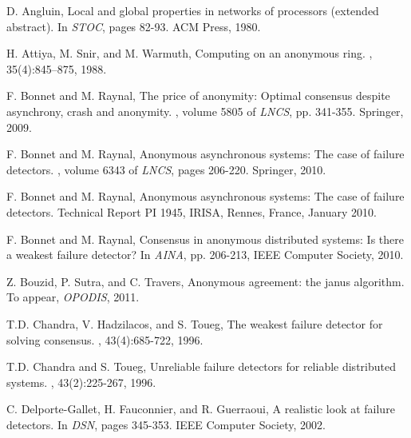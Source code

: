 \documentclass[10pt, conference, compsocconf]{IEEEtran}
\begin{document}
\begin{thebibliography}{10}\setlength{\itemsep}{0in}

{\small 



D. Angluin,
\newblock Local and global properties in networks of processors (extended
  abstract).
\newblock In {\em STOC}, pages 82-93. ACM Press, 1980.




H. Attiya, M. Snir, and M. Warmuth,
\newblock Computing on an anonymous ring.
, 35(4):845--875, 1988.





F. Bonnet and M. Raynal,
\newblock The price of anonymity: Optimal consensus despite asynchrony, crash
  and anonymity.
, volume 5805 of {\em LNCS}, pp. 341-355. Springer, 2009.

F.  Bonnet and M. Raynal,
\newblock Anonymous asynchronous systems: The case of failure detectors.
,
  volume 6343 of {\em LNCS}, pages 206-220. Springer, 2010.

F. Bonnet and M. Raynal,
\newblock Anonymous asynchronous systems: The case of failure detectors.
\newblock Technical Report PI 1945, IRISA, Rennes, France, January 2010.

F.  Bonnet and M. Raynal,
\newblock Consensus in anonymous distributed systems: Is there a weakest
  failure detector?
\newblock In {\em AINA}, pp. 206-213, IEEE Computer Society, 2010.

Z. Bouzid, P. Sutra, and C. Travers,
\newblock Anonymous agreement: the janus algorithm.
\newblock To appear,  {\em OPODIS}, 2011.

T.D. Chandra, V. Hadzilacos, and S. Toueg,
\newblock The weakest failure detector for solving consensus.
, 43(4):685-722, 1996.

T.D. Chandra and S. Toueg,
\newblock Unreliable failure detectors for reliable distributed systems.
, 43(2):225-267, 1996.




C. Delporte-Gallet, H. Fauconnier, and R. Guerraoui,
\newblock A realistic look at failure detectors.
\newblock In {\em DSN}, pages 345-353. IEEE Computer Society, 2002.

}
\end{thebibliography}
\end{document}
